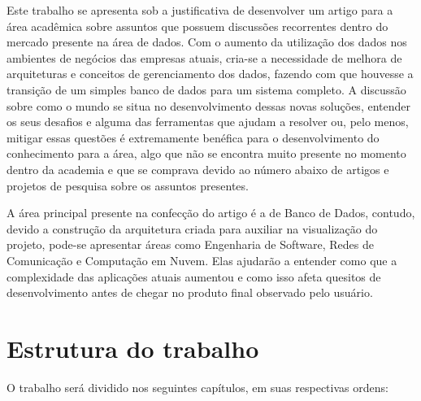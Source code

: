 Este trabalho se apresenta sob a justificativa de desenvolver um artigo para a área acadêmica sobre assuntos que possuem discussões recorrentes dentro do mercado presente na área de dados. Com o aumento da utilização dos dados nos ambientes de negócios das empresas atuais, cria-se a necessidade de melhora de arquiteturas e conceitos de gerenciamento dos dados, fazendo com que houvesse a transição de um simples banco de dados para um sistema completo. A discussão sobre como o mundo se situa no desenvolvimento dessas novas soluções, entender os seus desafios e alguma das ferramentas que ajudam a resolver ou, pelo menos, mitigar essas questões é extremamente benéfica para o desenvolvimento do conhecimento para a área, algo que não se encontra muito presente no momento dentro da academia e que se comprava devido ao número abaixo de artigos e projetos de pesquisa sobre os assuntos presentes.

A área principal presente na confecção do artigo é a de Banco de Dados, contudo, devido a construção da arquitetura criada para auxiliar na visualização do projeto, pode-se apresentar áreas como Engenharia de Software, Redes de Comunicação e Computação em Nuvem. Elas ajudarão a entender como que a complexidade das aplicações atuais aumentou e como isso afeta quesitos de desenvolvimento antes de chegar no produto final observado pelo usuário.

\section{Estrutura do trabalho}\label{sec:estruturaTrabalho}



O trabalho será dividido nos seguintes capítulos, em suas respectivas ordens:

